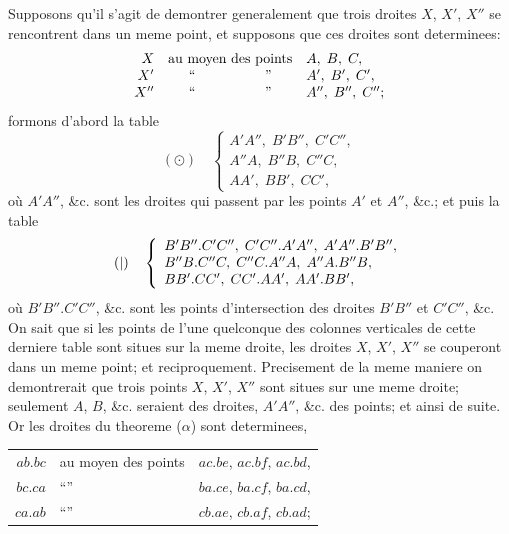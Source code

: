 \documentclass[12pt,a4paper]{article}
\begin{document}
Supposons qu'il s'agit de demontrer generalement que trois droites $X$, $X'$, $X''$ se rencontrent dans un meme point, et supposons que ces droites sont determinees:
\[
\begin{array}{rcl}
X & \text{au moyen des points} & A,\; B,\; C, \\
X' & \text{``\quad\quad\quad\quad\quad''} & A',\; B',\; C', \\
X'' & \text{``\quad\quad\quad\quad\quad''} & A'',\; B'',\; C'';
\end{array}
\]
formons d'abord la table
\[
(\odot)\quad
\left\{
\begin{array}{l}
A'A'',\; B'B'',\; C'C'', \\
A''A,\; B''B,\; C''C, \\
AA',\; BB',\; CC',
\end{array}
\right.
\]
o\`u $A'A''$, \&c. sont les droites qui passent par les points $A'$ et $A''$, \&c.; et puis la table
\[
(\\|)\quad
\left\{
\begin{array}{l}
B'B''.C'C'',\; C'C''.A'A'',\; A'A''.B'B'', \\
B''B.C''C,\; C''C.A''A,\; A''A.B''B, \\
BB'.CC',\; CC'.AA',\; AA'.BB',
\end{array}
\right.
\]
o\`u $B'B''.C'C''$, \&c. sont les points d'intersection des droites $B'B''$ et $C'C''$, \&c. On sait que si les points de l'une quelconque des colonnes verticales de cette derniere table sont situes sur la meme droite, les droites $X$, $X'$, $X''$ se couperont dans un meme point; et reciproquement. Precisement de la meme maniere on demontrerait que trois points $X$, $X'$, $X''$ sont situes sur une meme droite; seulement $A$, $B$, \&c. seraient des droites, $A'A''$, \&c. des points; et ainsi de suite. Or les droites du theoreme ($\alpha$) sont determinees,
\begin{center}
\begin{tabular}{r@{\quad}p{3cm}@{\quad}l}
$ab.bc$ & au moyen des points & $ac.be$,\; $ac.bf$,\; $ac.bd$, \\
$bc.ca$ & ``\quad\quad\quad\quad\quad\quad'' & $ba.ce$,\; $ba.cf$,\; $ba.cd$, \\
$ca.ab$ & ``\quad\quad\quad\quad\quad\quad'' & $cb.ae$,\; $cb.af$,\; $cb.ad$;
\end{tabular}
\end{center}
\end{document}

